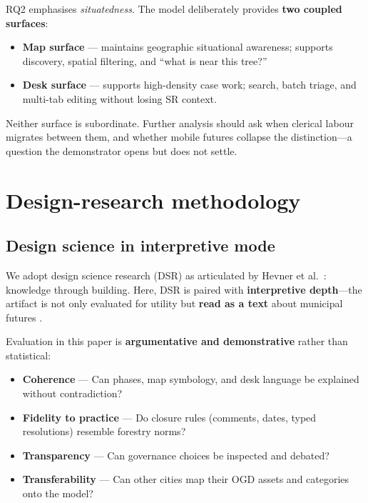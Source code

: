 \documentclass[12pt,a4paper]{article}
\begin{document}
RQ2 emphasises \emph{situatedness}. The model deliberately provides \textbf{two coupled surfaces}:

\begin{itemize}
    \item \textbf{Map surface} --- maintains geographic situational awareness; supports discovery, spatial filtering, and ``what is near this tree?''
    \item \textbf{Desk surface} --- supports high-density case work; search, batch triage, and multi-tab editing without losing SR context.
\end{itemize}

Neither surface is subordinate. Further analysis should ask when clerical labour migrates between them, and whether mobile futures collapse the distinction---a question the demonstrator opens but does not settle.

\section{Design-research methodology}
\label{sec:method}

\subsection{Design science in interpretive mode}

We adopt design science research (DSR) as articulated by Hevner et al.\ \cite{hevner2004}: knowledge through building. Here, DSR is paired with \textbf{interpretive depth}---the artifact is not only evaluated for utility but \textbf{read as a text} about municipal futures \cite{goldkuhl2019}.

Evaluation in this paper is \textbf{argumentative and demonstrative} rather than statistical:

\begin{itemize}
    \item \textbf{Coherence} --- Can phases, map symbology, and desk language be explained without contradiction?
    \item \textbf{Fidelity to practice} --- Do closure rules (comments, dates, typed resolutions) resemble forestry norms?
    \item \textbf{Transparency} --- Can governance choices be inspected and debated?
    \item \textbf{Transferability} --- Can other cities map their OGD assets and categories onto the model?
\end{itemize}
\end{document}
